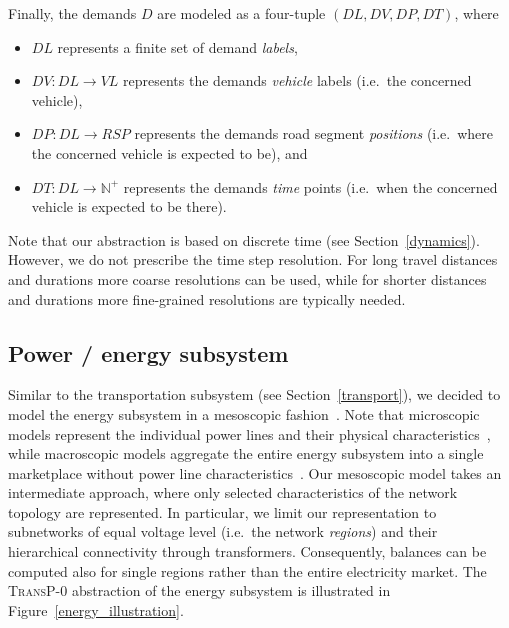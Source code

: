 Finally, the demands $D$ are modeled as a four-tuple $(DL, DV, DP, DT)$, where
\begin{itemize}
	\item $DL$ represents a finite set of demand \textit{labels},
	\item $DV: DL \rightarrow VL$ represents the demands \textit{vehicle} labels (i.e.\ the concerned vehicle),
	\item $DP: DL \rightarrow RSP$ represents the demands road segment \textit{positions} (i.e.\ where the concerned vehicle is expected to be), and
	\item $DT: DL \rightarrow \mathbb{N}^+$ represents the demands \textit{time} points (i.e.\ when the concerned vehicle is expected to be there).
\end{itemize}
Note that our abstraction is based on discrete time (see Section~\ref{dynamics}). However, we do not prescribe the time step resolution. For long travel distances and durations more coarse resolutions can be used, while for shorter distances and durations more fine-grained resolutions are typically needed.

\subsection{Power / energy subsystem}
\label{energy_system}

Similar to the transportation subsystem (see Section~\ref{transport}), we decided to model the energy subsystem in a mesoscopic fashion~\cite{Hackenberg2012}. Note that microscopic models represent the individual power lines and their physical characteristics~\cite{Dommel1968}, while macroscopic models aggregate the entire energy subsystem into a single marketplace without power line characteristics~\cite{Castronuovo2004}. Our mesoscopic model takes an intermediate approach, where only selected characteristics of the network topology are represented. In particular, we limit our representation to subnetworks of equal voltage level (i.e.\ the network \textit{regions}) and their hierarchical connectivity through transformers. Consequently, balances can be computed also for single regions rather than the entire electricity market. The \textsc{TransP-0} abstraction of the energy subsystem is illustrated in Figure~\ref{energy_illustration}.

